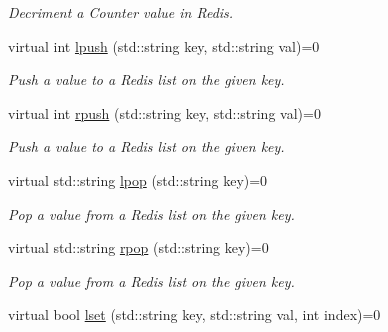 \begin{DoxyCompactItemize}
\begin{DoxyCompactList}\small\item\em Decriment a Counter value in Redis. \end{DoxyCompactList}\item 
virtual int \hyperlink{classRedisInterface_a300bdd29f8a198b57f4760c24d832e46}{lpush} (std\+::string key, std\+::string val)=0\hypertarget{classRedisInterface_a300bdd29f8a198b57f4760c24d832e46}{}\label{classRedisInterface_a300bdd29f8a198b57f4760c24d832e46}

\begin{DoxyCompactList}\small\item\em Push a value to a Redis list on the given key. \end{DoxyCompactList}\item 
virtual int \hyperlink{classRedisInterface_a7a1e75499b8beda20d514f4baa0c488b}{rpush} (std\+::string key, std\+::string val)=0\hypertarget{classRedisInterface_a7a1e75499b8beda20d514f4baa0c488b}{}\label{classRedisInterface_a7a1e75499b8beda20d514f4baa0c488b}

\begin{DoxyCompactList}\small\item\em Push a value to a Redis list on the given key. \end{DoxyCompactList}\item 
virtual std\+::string \hyperlink{classRedisInterface_a461d229377c71435c0f83f42a2e3acae}{lpop} (std\+::string key)=0\hypertarget{classRedisInterface_a461d229377c71435c0f83f42a2e3acae}{}\label{classRedisInterface_a461d229377c71435c0f83f42a2e3acae}

\begin{DoxyCompactList}\small\item\em Pop a value from a Redis list on the given key. \end{DoxyCompactList}\item 
virtual std\+::string \hyperlink{classRedisInterface_ad10c64204a6ea7e11605848c968939b2}{rpop} (std\+::string key)=0\hypertarget{classRedisInterface_ad10c64204a6ea7e11605848c968939b2}{}\label{classRedisInterface_ad10c64204a6ea7e11605848c968939b2}

\begin{DoxyCompactList}\small\item\em Pop a value from a Redis list on the given key. \end{DoxyCompactList}\item 
virtual bool \hyperlink{classRedisInterface_af4fd798b32c37f6ca6561284d66a8265}{lset} (std\+::string key, std\+::string val, int index)=0\hypertarget{classRedisInterface_af4fd798b32c37f6ca6561284d66a8265}{}\label{classRedisInterface_af4fd798b32c37f6ca6561284d66a8265}


\end{DoxyCompactItemize}
